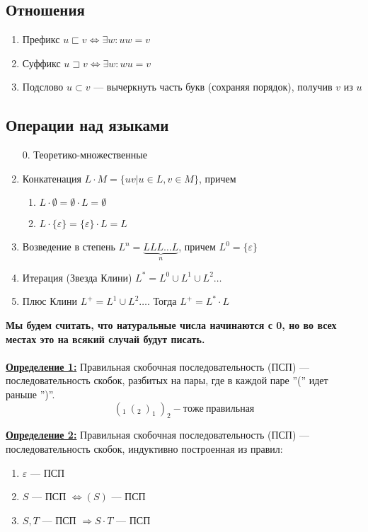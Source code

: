 \subsection{Отношения}
\begin{enumerate}
    \item Префикс $u \sqsubset v \Leftrightarrow \exists w: uw = v$
    \item Суффикс $u \sqsupset v \Leftrightarrow \exists w: wu = v$
    \item Подслово $u \subset v$ --- вычеркнуть часть букв (сохраняя порядок), получив $v$ из $u$
\end{enumerate}
\subsection{Операции над языками}
\begin{enumerate}
    \item[0.] Теоретико-множественные
    \item Конкатенация $L\cdot M = \{uv | u \in L, v \in M\}$, причем
    \begin{enumerate}
        \item $L\cdot \emptyset = \emptyset\cdot L = \emptyset$
        \item $L\cdot \{\varepsilon\} = \{\varepsilon\}\cdot L = L$
    \end{enumerate}
    \item Возведение в степень $L^n = \underbrace{LLL\dots L}_n$, причем $L^0 = \{\varepsilon\}$
    \item Итерация (Звезда Клини) $L^*=L^0\cup L^1\cup L^2\dots$
    \item Плюс Клини $L^+=L^1\cup L^2\dots$. Тогда $L^+ = L^* \cdot L$
\end{enumerate}
\textbf{Мы будем считать, что натуральные числа начинаются с 0, но во всех местах это на всякий случай будут писать.}
\\\\

\textbf{\underline{Определение 1:}} Правильная скобочная последовательность (ПСП) --- последовательность скобок, разбитых на пары, где в каждой паре ''('' идет раньше '')''.
$$(_1\ (_2\ )_1\ )_2 - тоже\ правильная$$

\textbf{\underline{Определение 2:}} Правильная скобочная последовательность (ПСП) --- последовательность скобок, индуктивно построенная из правил: 
\begin{enumerate}
    \item $\varepsilon$ --- ПСП
    \item $S$ --- ПСП $\Leftrightarrow (S)$ --- ПСП
    \item $S, T$ --- ПСП $\Rightarrow S\cdot T$ --- ПСП
\end{enumerate}


